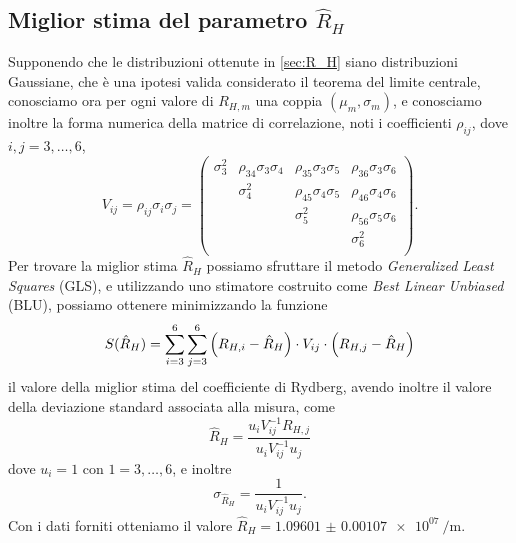 \documentclass[a4paper,aps,12pt,tightenlines]{revtex4-2}
\begin{document}
\subsection{Miglior stima del parametro $\hat R_H$}
Supponendo che le distribuzioni ottenute in \autoref{sec:R_H} siano distribuzioni Gaussiane, che è una ipotesi valida considerato il teorema del limite centrale, conosciamo ora per ogni valore di $R_{H,m}$ una coppia $(\mu_m, \sigma_m)$, e conosciamo inoltre la forma numerica della matrice di correlazione, noti i coefficienti $\rho_{ij}$, dove $i,j=3,\dots, 6$, \begin{equation}
V_{ij}=\rho_{ij}\sigma_i\sigma_j=\left(
\begin{matrix}
\sigma_3^2 & \rho_{34}\sigma_3\sigma_4 & \rho_{35}\sigma_3\sigma_5 & \rho_{36}\sigma_3\sigma_6 \\
& \sigma_4^2 & \rho_{45}\sigma_4\sigma_5 & \rho_{46}\sigma_4\sigma_6 \\
& & \sigma_5^2 & \rho_{56}\sigma_5\sigma_6 \\
& & & \sigma_6^2 \\
\end{matrix}
\right).
\end{equation} Per trovare la miglior stima $\hat R_H$ possiamo sfruttare il metodo \emph{Generalized Least Squares} (GLS), e utilizzando uno stimatore costruito come \emph{Best Linear Unbiased} (BLU), possiamo ottenere minimizzando la funzione \begin{equation} S(\hat R_H) = \sum_{i=3}^{6}\sum_{j = 3}^6 \qty(R_{H,i} - \hat R_H)\cdot V_{ij} \cdot \qty(R_{H,j} - \hat R_H) \end{equation} il valore della miglior stima del coefficiente di Rydberg, avendo inoltre il valore della deviazione standard associata alla misura, come \begin{equation} \hat R_H = \frac{u_i V_{ij}^{-1} R_{H,j}}{u_i V_{ij}^{-1} u_j}\end{equation} dove $u_i = 1$  con $1=3, \dots, 6$, e inoltre \begin{equation} \sigma_{\hat R_H} = \frac{1}{u_i V_{ij}^{-1} u_j}.\end{equation} Con i dati forniti otteniamo il valore $\hat R_H = \SI{1.09601(107)e+07}{\per\meter}$.


\end{document}
